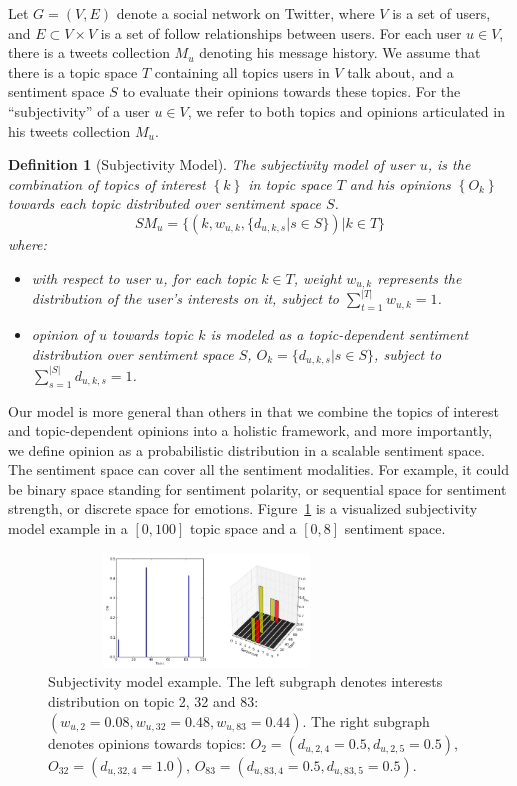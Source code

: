 \documentclass[letterpaper]{article}
\newtheorem{definition}{Definition}
\begin{document}
Let $G=\left( V,E \right) $ denote a social network on Twitter, where $ V $ is a set of users, and $ E\subset V\times V $ is a set of follow relationships between users. For each user $ u \in V $, there is a tweets collection $ M_{u} $ denoting his message history. We assume that there is a topic space $ T $ containing all topics users in $ V $ talk about, and a sentiment space $ S $ to evaluate their opinions towards these topics. 
For the ``subjectivity'' of a user $ u  \in V $, we refer to both topics and opinions articulated in his tweets collection $ M_{u} $.  
\begin{definition}[Subjectivity Model]
The subjectivity model of user $ u $, is the combination of topics of interest $\left\lbrace  k \right\rbrace $ in topic space $T$ and his opinions $\left\lbrace O_{k}\right\rbrace $ towards each topic distributed over sentiment space $ S $. 
\begin{equation*}
\label{usermodel}
SM_{u}  = \lbrace \left( k, w_{u,k} , \lbrace d_{u,k,s} |s \in S \rbrace \right) |  k \in T \rbrace
\end{equation*}
where:
\begin{itemize}
\item with respect to user $ u $, for each topic $k \in T$, weight $ w_{u,k} $ represents the distribution of the user's interests on it, subject to $ \sum_{t=1}^{|T|}w_{u,k} =1 $.
\item opinion of $ u $ towards topic $k$ is modeled as a topic-dependent sentiment distribution over sentiment space $ S $, $O_{k}=\lbrace d_{u,k,s}|s \in S \rbrace $, subject to $ \sum_{s=1}^{|S|} d_{u,k,s}=1$.
\end{itemize}
\end{definition}
Our model is more general than others in that we combine the topics of interest and topic-dependent opinions into a holistic framework, and more importantly, we define opinion as a probabilistic distribution in a scalable sentiment space. The sentiment space can cover all the sentiment modalities. For example, it could be binary space standing for sentiment polarity, or sequential space for sentiment strength, or discrete space for emotions. 
Figure~\ref{fig0} is a visualized subjectivity model example in a $ [0,100] $ topic space and a $ [0,8] $ sentiment space. 
\begin{figure}[t]
\includegraphics[width=3.3in,height=1.2in]{fig1.pdf}
\caption{Subjectivity model example. The left subgraph denotes interests distribution on topic 2, 32 and 83: $ (  w_{u,2}=0.08,w_{u,32}=0.48, w_{u,83}=0.44)  $. The right subgraph denotes opinions towards topics: $ O_{2}=( d_{u,2,4} =0.5, d_{u,2,5} =0.5)$, $O_{32}=(d_{u,32,4}=1.0) $, $ O_{83}=( d_{u,83,4}=0.5, d_{u,83,5}=0.5 ) $.}
\label{fig0}
\end{figure}
\end{document}
